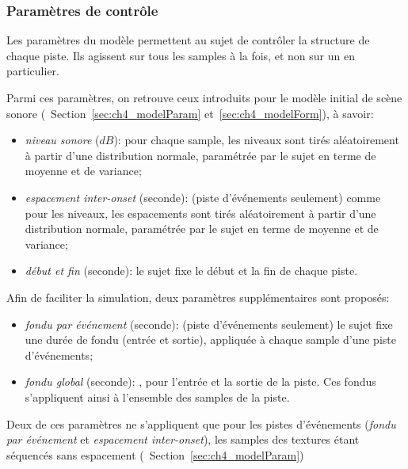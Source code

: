 \subsubsection{Paramètres de contrôle}
\label{sec:ch4_param}

Les paramètres du modèle permettent au sujet de contrôler la structure de chaque piste. Ils agissent sur tous les samples à la fois, et non sur un en particulier.

Parmi ces paramètres, on retrouve ceux introduits pour le modèle initial de scène sonore (\cf~Section~\ref{sec:ch4_modelParam} et~\ref{sec:ch4_modelForm}), à savoir:

\begin{itemize}
\item \emph{niveau sonore} ($dB$): pour chaque sample, les niveaux sont tirés aléatoirement à partir d'une distribution normale, paramétrée par le sujet en terme de moyenne et de variance;
\item \emph{espacement inter-onset} (seconde): (piste d'événements seulement) comme pour les niveaux, les espacements sont tirés aléatoirement à partir d'une distribution normale, paramétrée par le sujet en terme de moyenne et de variance;
\item \emph{début et fin} (seconde): le sujet fixe le début et la fin de chaque piste.
\end{itemize}

Afin de faciliter la simulation, deux paramètres supplémentaires sont proposés:

\begin{itemize}
\item \emph{fondu par événement} (seconde): (piste d'événements seulement) le sujet fixe une durée de fondu (entrée et sortie), appliquée à chaque sample d'une piste d'événements;
\item \emph{fondu global} (seconde):  , pour l'entrée et la sortie de la piste. Ces fondus s'appliquent ainsi à l'ensemble des samples de la piste.
\end{itemize}

Deux de ces paramètres ne s’appliquent que pour les pistes d'événements (\emph{fondu par événement} et \emph{espacement inter-onset}), les samples des textures étant séquencés sans espacement (\cf~Section~\ref{sec:ch4_modelParam})

